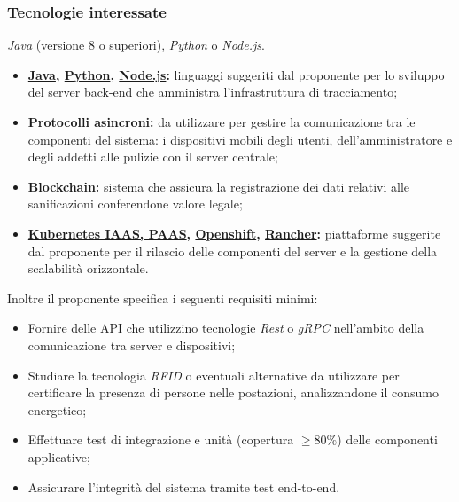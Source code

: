 \subsubsection{Tecnologie interessate}

\textit{\href{https://www.java.com/it/about/}{Java}} (versione 8 o superiori), \textit{\href{https://www.python.org/about/}{Python}} o \textit{\href{https://nodejs.org/it/about/}{Node.js}}.
\begin{itemize}
	\item{\textbf{\href{https://www.java.com/it/about/}{Java}, \href{https://www.python.org/about/}{Python}, \href{https://nodejs.org/it/about/}{Node.js}:}} linguaggi suggeriti dal proponente per lo sviluppo del server back-end che amministra l'infrastruttura di tracciamento;
	\item{\textbf{Protocolli asincroni:}} da utilizzare per gestire la comunicazione tra le componenti del sistema: i dispositivi mobili degli utenti, dell'amministratore e degli addetti alle pulizie con il server centrale;
	\item{\textbf{Blockchain:}} sistema che assicura la registrazione dei dati relativi alle sanificazioni conferendone valore legale;  
	\item{\textbf{\href{https://kubernetes.io/it/docs/concepts/overview/what-is-kubernetes/}{Kubernetes IAAS, PAAS}, \href{https://www.openshift.com/learn/what-is-openshift}{Openshift}, \href{https://rancher.com/about/}{Rancher}:}} piattaforme suggerite dal proponente per il rilascio delle componenti del server e la gestione della scalabilità orizzontale.
\end{itemize}

Inoltre il proponente specifica i seguenti requisiti minimi:
\begin{itemize}
	\item Fornire delle API che utilizzino tecnologie \textit{Rest} o \textit{gRPC} nell'ambito della comunicazione tra server e dispositivi;
	\item Studiare la tecnologia \textit{RFID} o eventuali alternative da utilizzare per certificare la presenza di persone nelle postazioni, analizzandone il consumo energetico;
	\item Effettuare test di integrazione e unità (copertura $\geq 80\%$) delle componenti applicative;
	\item Assicurare l'integrità del sistema tramite test end-to-end.
\end{itemize}
	
	
	
